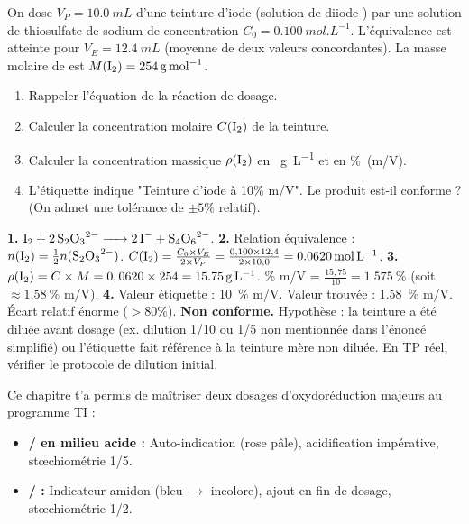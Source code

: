 \documentclass[11pt]{article}
\newcounter{popsec}
\newcounter{popsub}
\newcommand{\courssub}[1]{%
  \stepcounter{popsub}%
  \par\vspace{9pt}\noindent{\popxbold\fontsize{11.5}{13}\selectfont\color{popink}{\color{poporange}\thepopsec.\thepopsub}\hspace{6pt}#1}\par\nopagebreak\vspace{4pt}
}
\begin{document}
\begin{exercice}
On dose $V_P = \SI{10,0}{mL}$ d'une teinture d'iode (solution de diiode ) par une solution de thiosulfate de sodium  de concentration $C_0 = \SI{0,100}{mol.L^{-1}}$.
L'équivalence est atteinte pour $V_E = \SI{12,4}{mL}$ (moyenne de deux valeurs concordantes).
La masse molaire de  est $M(\ce{I2}) = \SI{254}{g.mol^{-1}}$.
\begin{enumerate}
\item Rappeler l'équation de la réaction de dosage.
\item Calculer la concentration molaire $C(\ce{I2})$ de la teinture.
\item Calculer la concentration massique $\rho(\ce{I2})$ en \SI{}{g.L^{-1}} et en \%\ (m/V).
\item L'étiquette indique "Teinture d'iode à 10\% m/V". Le produit est-il conforme ? (On admet une tolérance de $\pm 5\%$ relatif).
\end{enumerate}
\end{exercice}

\begin{corrige}
\textbf{1.} $\ce{I2 + 2S2O3^2- -> 2I- + S4O6^2-}$.
\textbf{2.} Relation équivalence : $n(\ce{I2}) = \frac{1}{2} n(\ce{S2O3^2-})$.
$C(\ce{I2}) = \frac{C_0 \times V_E}{2 \times V_P} = \frac{0,100 \times 12,4}{2 \times 10,0} = \SI{0,0620}{mol.L^{-1}}$.
\textbf{3.} $\rho(\ce{I2}) = C \times M = 0,0620 \times 254 = \SI{15,75}{g.L^{-1}}$.
\% m/V = $\frac{15,75}{10} = \SI{1,575}{\%}$ (soit $\approx \SI{1,58}{\%}$ m/V).
\textbf{4.} Valeur étiquette : \SI{10}{\%} m/V. Valeur trouvée : \SI{1,58}{\%} m/V.
Écart relatif énorme ($> 80\%$). \textbf{Non conforme.} Hypothèse : la teinture a été diluée avant dosage (ex. dilution 1/10 ou 1/5 non mentionnée dans l'énoncé simplifié) ou l'étiquette fait référence à la teinture mère non diluée. En TP réel, vérifier le protocole de dilution initial.
\end{corrige}

\courssub{Conclusion et synthèse}

Ce chapitre t'a permis de maîtriser deux dosages d'oxydoréduction majeurs au programme TI :
\begin{itemize}
\item \textbf{/ en milieu acide :} Auto-indication (rose pâle), acidification  impérative, stœchiométrie 1/5.
\item \textbf{/ :} Indicateur amidon (bleu $\rightarrow$ incolore), ajout en fin de dosage, stœchiométrie 1/2.
\end{itemize}
\end{document}
